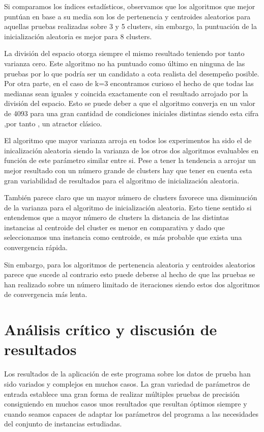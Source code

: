 \documentclass[a4paper]{report}
\begin{document}
	
	Si comparamos los índices estadísticos, observamos que los algoritmos que mejor puntúan en base a su media son los de pertenencia y centroides aleatorios para aquellas pruebas realizadas sobre 3 y 5 clusters, sin embargo, la puntuación de la inicialización aleatoria es mejor para 8 clusters.
	
	La división del espacio otorga siempre el mismo resultado teniendo por tanto varianza cero. Este algoritmo no ha puntuado como último en ninguna de las pruebas por lo que podría ser un candidato a cota realista del desempeño posible. Por otra parte, en el caso de k=3 encontramos curioso el hecho de que todas las medianas sean iguales y coincida exactamente con el resultado arrojado por la división del espacio. Esto se puede deber a que el algoritmo converja en un valor de 4093 para una gran cantidad de condiciones iniciales distintas siendo esta cifra ,por tanto , un atractor clásico.

	El algoritmo que mayor varianza arroja en todos los experimentos ha sido el de inicalización aleatoria siendo la varianza de los otros dos algoritmos evaluables en función de este parámetro similar entre si. Pese a tener la tendencia a arrojar un mejor resultado con un número grande de clusters hay que tener en cuenta esta gran variabilidad de resultados para el algoritmo de inicialización aleatoria.
	
	También parece claro que un mayor número de clusters favorece una disminución de la varianza para el algoritmo de inicialización aleatoria. Esto tiene sentido si entendemos que a mayor número de clusters la distancia de las distintas instancias al centroide del cluster es menor en comparativa y dado que seleccionamos una instancia como centroide, es más probable que exista una convergencia rápida.
	
	Sin embargo, para los algoritmos de pertenencia aleatoria y centroides aleatorios parece que sucede al contrario esto puede deberse al hecho de que las pruebas se han realizado sobre un número limitado de iteraciones siendo estos dos algoritmos de convergencia más lenta.
	\section{Análisis crítico y discusión de resultados}
	Los resultados de la aplicación de este programa sobre los datos de prueba han sido variados y complejos en muchos casos. La gran variedad de parámetros de entrada establece una gran forma de realizar múltiples pruebas de precisión consiguiendo en muchos casos unos resultados que resultan óptimos siempre y cuando seamos capaces de adaptar los parámetros del programa a las necesidades del conjunto de instancias estudiadas.
	
\end{document}
